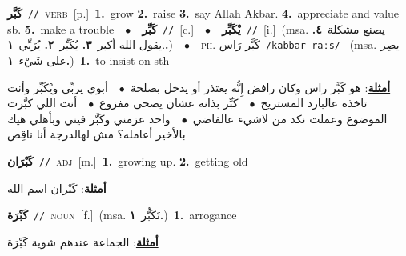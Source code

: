 \documentclass[10pt,a4paper,twoside]{article} %
\begin{document}
\begin{multicols}{2}
{\setlength\topsep{0pt}\textbf{\foreignlanguage{arabic}{كَبَّر}}\ {\color{gray}\texttt{//}\color{black}}\ \textsc{verb}\ [p.]\ \textbf{1.}~grow  \textbf{2.}~raise  \textbf{3.}~say Allah Akbar.  \textbf{4.}~appreciate and value sb.  \textbf{5.}~make a trouble\ \ $\bullet$\ \ \setlength\topsep{0pt}\textbf{\foreignlanguage{arabic}{كَبِّر}}\ {\color{gray}\texttt{//}\color{black}}\ [c.]\ \ $\bullet$\ \ \setlength\topsep{0pt}\textbf{\foreignlanguage{arabic}{يْكَبِّر}}\ {\color{gray}\texttt{//}\color{black}}\ [i.]\ \color{gray}(msa. \foreignlanguage{arabic}{يصنع مشكلة}~\foreignlanguage{arabic}{\textbf{٤.}}  .\foreignlanguage{arabic}{يقول الله أكبر}~\foreignlanguage{arabic}{\textbf{٣.}}  \foreignlanguage{arabic}{يُكَبِّر}~\foreignlanguage{arabic}{\textbf{٢.}}  \foreignlanguage{arabic}{يُرَبِّي}~\foreignlanguage{arabic}{\textbf{١.}})\color{black}\ \ $\bullet$\ \ \textsc{ph.} \color{gray} \foreignlanguage{arabic}{كَبَّر رَاس}\color{black}\ {\color{gray}\texttt{/{\sffamily kabbar raːs}/}\color{black}}\ \color{gray} (msa. \foreignlanguage{arabic}{يصِر على شَيْء}~\foreignlanguage{arabic}{\textbf{١.}})\color{black}\ \textbf{1.}~to insist on sth\  \begin{flushright}\color{gray}\foreignlanguage{arabic}{\textbf{\underline{\foreignlanguage{arabic}{أمثلة}}}: هو كَبَّر راس وكان رافض إِنُّه يعتذر أو يدخل بصلحة\ $\bullet$\ \  أبوي يربِّي ويْكَبِّر وأنت تاخذه عالبارد المستريح\ $\bullet$\ \  كَبِّر بذانه عشان يصحى مفزوع\ $\bullet$\ \  أنت اللي كبَّرت الموضوع وعملت نكد من لاشيء عالفاضي\ $\bullet$\ \  واحد عزمني وكَبَّر فيني وبأهلي هيك بالأخير أعامله؟ مش لهالدرجة أنا ناقِص}\end{flushright}\color{black}} \vspace{2mm}

{\setlength\topsep{0pt}\textbf{\foreignlanguage{arabic}{كَبْرَان}}\ {\color{gray}\texttt{//}\color{black}}\ \textsc{adj}\ [m.]\ \textbf{1.}~growing up.  \textbf{2.}~getting old\  \begin{flushright}\color{gray}\foreignlanguage{arabic}{\textbf{\underline{\foreignlanguage{arabic}{أمثلة}}}: كَبْران اسم الله}\end{flushright}\color{black}} \vspace{2mm}

{\setlength\topsep{0pt}\textbf{\foreignlanguage{arabic}{كَبْرَة}}\ {\color{gray}\texttt{//}\color{black}}\ \textsc{noun}\ [f.]\ \color{gray}(msa. \foreignlanguage{arabic}{تَكَبُّر}~\foreignlanguage{arabic}{\textbf{١.}})\color{black}\ \textbf{1.}~arrogance\  \begin{flushright}\color{gray}\foreignlanguage{arabic}{\textbf{\underline{\foreignlanguage{arabic}{أمثلة}}}: الجماعة عندهم شوية كَبْرَة}\end{flushright}\color{black}} \vspace{2mm}


\end{multicols}
\end{document}
